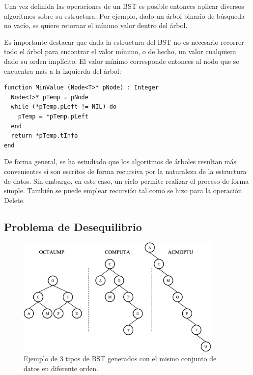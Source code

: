 Una vez definida las operaciones de un BST es posible entonces aplicar diversos algoritmos sobre su estructura. Por ejemplo, dado un árbol binario de búsqueda no vacío, se quiere retornar el mínimo valor dentro del árbol.

Es importante destacar que dada la estructura del BST no es necesario recorrer todo el árbol para encontrar el valor mínimo, o de hecho, un valor cualquiera dado su orden implícito. El valor mínimo corresponde entonces al nodo que se encuentra más a la izquierda del árbol:

\begin{lstlisting}[upquote=true, language=pseudo]
function MinValue (Node<T>* pNode) : Integer
  Node<T>* pTemp = pNode
  while (*pTemp.pLeft != NIL) do
    pTemp = *pTemp.pLeft
  end
  return *pTemp.tInfo
end
\end{lstlisting}

De forma general, se ha estudiado que los algoritmos de árboles resultan más convenientes si son escritos de forma recursiva por la naturaleza de la estructura de datos. Sin embargo, en este caso, un ciclo permite realizar el proceso de forma simple. También se puede emplear recursión tal como se hizo para la operación Delete.

\subsection{Problema de Desequilibrio} \label{lb:desq}

\begin{figure}[htpb!]
  \begin{center}
    \includegraphics[width=0.9\textwidth]{images/BSTDesequilibrado.eps}
  \end{center}
  \caption{Ejemplo de 3 tipos de BST generados con el mismo conjunto de datos en diferente orden.}
  \label{fig:BSTDesequilibrado}
\end{figure}

